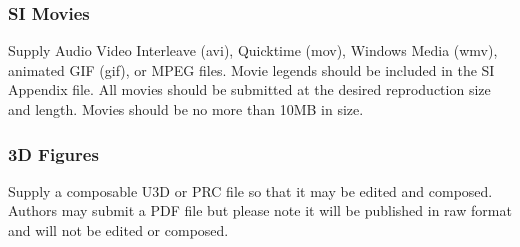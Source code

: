 \documentclass[9pt,twocolumn,twoside,lineno]{pnas-new}
\begin{document}
\subsubsection*{SI Movies}

Supply Audio Video Interleave (avi), Quicktime (mov), Windows Media (wmv), animated GIF (gif), or MPEG files. Movie legends should be included in the SI Appendix file. All movies should be submitted at the desired reproduction size and length. Movies should be no more than 10MB in size.


\subsubsection*{3D Figures}

Supply a composable U3D or PRC file so that it may be edited and composed. Authors may submit a PDF file but please note it will be published in raw format and will not be edited or composed.



\showmatmethods{} %


\showacknow{} %


\end{document}
